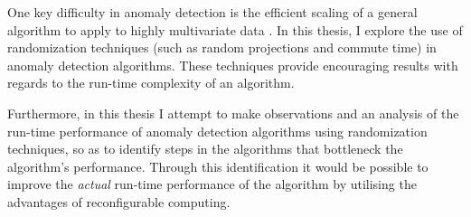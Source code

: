 One key difficulty in anomaly detection is the efficient scaling of a general
algorithm to apply to highly multivariate data \citeNeeded{}. In this thesis, I
explore the use of randomization techniques (such as random projections and
commute time) in anomaly detection algorithms. These techniques provide
encouraging results with regards to the run-time complexity of an algorithm.

Furthermore, in this thesis I attempt to make observations and an analysis of
the run-time performance of anomaly detection algorithms using randomization
techniques, so as to identify steps in the algorithms that bottleneck the
algorithm's performance. Through this identification it would be possible to
improve the \emph{actual} run-time performance of the algorithm by utilising
the advantages of reconfigurable computing.
